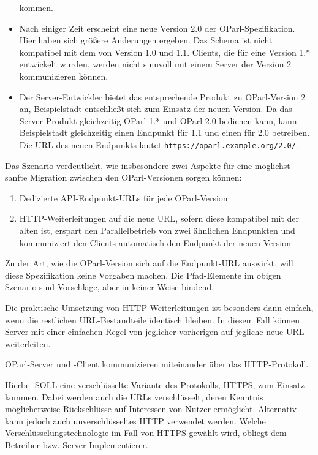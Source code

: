 \documentclass[,a4paper]{article}
\begin{document}
\begin{itemize}
  kommen.
\item
  Nach einiger Zeit erscheint eine neue Version 2.0 der
  OParl-Spezifikation. Hier haben sich größere Änderungen ergeben. Das
  Schema ist nicht kompatibel mit dem von Version 1.0 und 1.1. Clients,
  die für eine Version 1.* entwickelt wurden, werden nicht sinnvoll mit
  einem Server der Version 2 kommunizieren können.
\item
  Der Server-Entwickler bietet das entsprechende Produkt zu
  OParl-Version 2 an, Beispielstadt entschließt sich zum Einsatz der
  neuen Version. Da das Server-Produkt gleichzeitig OParl 1.* und OParl
  2.0 bedienen kann, kann Beispielstadt gleichzeitig einen Endpunkt für
  1.1 und einen für 2.0 betreiben. Die URL des neuen Endpunkts lautet
  \texttt{https://oparl.example.org/2.0/}.
\end{itemize}

Das Szenario verdeutlicht, wie insbesondere zwei Aspekte für eine
möglichst sanfte Migration zwischen den OParl-Versionen sorgen können:

\begin{enumerate}
\def\labelenumi{\arabic{enumi}.}
\item
  Dedizierte API-Endpunkt-URLs für jede OParl-Version
\item
  HTTP-Weiterleitungen auf die neue URL, sofern diese kompatibel mit der
  alten ist, erspart den Parallelbetrieb von zwei ähnlichen Endpunkten
  und kommuniziert den Clients automatisch den Endpunkt der neuen
  Version
\end{enumerate}

Zu der Art, wie die OParl-Version sich auf die Endpunkt-URL auswirkt,
will diese Spezifikation keine Vorgaben machen. Die Pfad-Elemente im
obigen Szenario sind Vorschläge, aber in keiner Weise bindend.

Die praktische Umsetzung von HTTP-Weiterleitungen ist besonders dann
einfach, wenn die restlichen URL-Bestandteile identisch bleiben. In
diesem Fall können Server mit einer einfachen Regel von jeglicher
vorherigen auf jegliche neue URL weiterleiten.


OParl-Server und -Client kommunizieren miteinander über das
HTTP-Protokoll.

Hierbei SOLL eine verschlüsselte Variante des Protokolls, HTTPS, zum
Einsatz kommen. Dabei werden auch die URLs verschlüsselt, deren Kenntnis
möglicherweise Rückschlüsse auf Interessen von Nutzer ermöglicht.
Alternativ kann jedoch auch unverschlüsseltes HTTP verwendet werden.
Welche Verschlüsselungstechnologie im Fall von HTTPS gewählt wird,
obliegt dem Betreiber bzw. Server-Implementierer.
\end{document}
